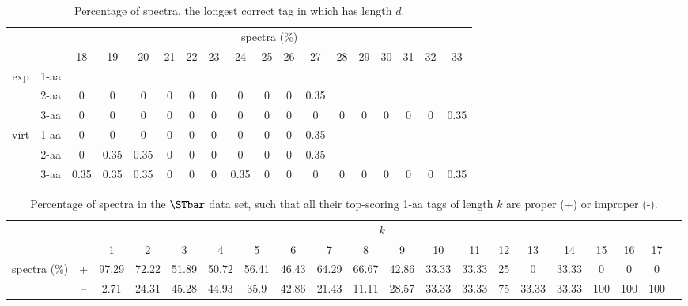 \begin{table}[h]\tiny
\vspace{3mm}
{\centering
\begin{center}
\begin{tabular}{|c|l|c|c|c|c|c|c|c|c|c|c|c|c|c|c|c|c|}
  \hline
  \multicolumn{2}{|c|}{ } & \multicolumn{ 16 }{|c|}{ spectra (\%)} \\
  \cline{3- 18}
  \multicolumn{2}{|c|}{ }  & 18 & 19 & 20 & 21 & 22 & 23 & 24 & 25 & 26 & 27 & 28 & 29 & 30 & 31 & 32 & 33\\
  \hline
  \multirow{3}{*}{exp}
&  1-aa  &  &  &  &  &  &  &  &  &  &  &  &  &  &  &  & \\
&  2-aa  & 0 & 0 & 0 & 0 & 0 & 0 & 0 & 0 & 0 & 0.35 &  &  &  &  &  & \\
&  3-aa  & 0 & 0 & 0 & 0 & 0 & 0 & 0 & 0 & 0 & 0 & 0 & 0 & 0 & 0 & 0 & 0.35\\
 \hline
  \multirow{3}{*}{virt} 
&  1-aa  & 0 & 0 & 0 & 0 & 0 & 0 & 0 & 0 & 0 & 0.35 &  &  &  &  &  & \\
&  2-aa  & 0 & 0.35 & 0.35 & 0 & 0 & 0 & 0 & 0 & 0 & 0.35 &  &  &  &  &  & \\
&  3-aa  & 0.35 & 0.35 & 0.35 & 0 & 0 & 0 & 0.35 & 0 & 0 & 0 & 0 & 0 & 0 & 0 & 0 & 0.35\\
 \hline
\end{tabular}
\end{center}
\par}
\centering

\caption{ Percentage of spectra, the longest correct tag in which has length $d$.}

\vspace{3mm}
\label{table:longest-correct-d-tag}
\end{table}
\begin{table}[ht]\footnotesize
\vspace{3mm}
{\centering
\begin{center}
\begin{tabular}{|c|c|c|c|c|c|c|c|c|c|c|c|c|c|c|c|c|c|c|c|}
  \hline
  \multicolumn{2}{|c|}{ } & \multicolumn{ 17}{|c|}{$k$} \\
  \cline{3-19 }
  \multicolumn{2}{|c|}{ } 
 & 1 & 2 & 3 & 4 & 5 & 6 & 7 & 8 & 9 & 10 & 11 & 12 & 13 & 14 & 15 & 16 & 17\\
  \hline
  \multirow{2}{*}{spectra (\%)} & +  & 97.29 & 72.22 & 51.89 & 50.72 & 56.41 & 46.43 & 64.29 & 66.67 & 42.86 & 33.33 & 33.33 & 25 & 0 & 33.33 & 0 & 0 & 0 \\
      & --  & 2.71 & 24.31 & 45.28 & 44.93 & 35.9 & 42.86 & 21.43 & 11.11 & 28.57 & 33.33 & 33.33 & 75 & 33.33 & 33.33 & 100 & 100 & 100 \\
  \hline
\end{tabular}
\end{center}
\par}
\centering

\caption{Percentage of spectra in the $\STbar$ data set, such that all their top-scoring 1-aa tags of length $k$ are proper (+) or improper (-).}

\vspace{3mm}
\label{table:all-top-scoring}
\end{table}
